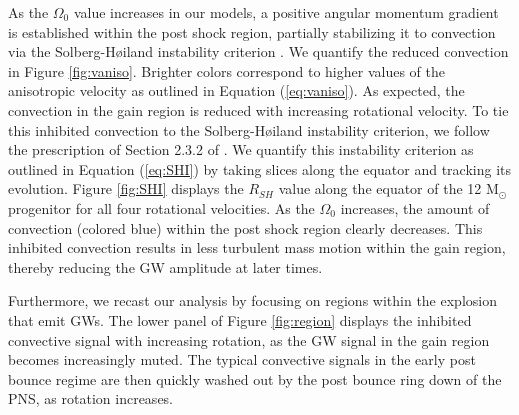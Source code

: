 \documentclass[twocolumn,times]{aastex62}  %
\newcommand{\Msun}{\ensuremath{\mathrm{M}_\odot}\xspace}
\begin{document}
  As the $\Omega_0$ value increases in our models, a positive angular momentum gradient is established within the post shock region, partially stabilizing it to convection via the Solberg-H{\o}iland instability criterion \citep{endal:1978,fryer:2000}.  We quantify the reduced convection in Figure \ref{fig:vaniso}.  Brighter colors correspond to higher values of the anisotropic velocity as outlined in Equation (\ref{eq:vaniso}).  As expected, the convection in the gain region is reduced with increasing rotational velocity.  To tie this inhibited convection to the Solberg-H{\o}iland instability criterion, we follow the prescription of Section 2.3.2 of \citet{heger:2000}.  We quantify this instability criterion as outlined in Equation (\ref{eq:SHI}) by taking slices along the equator and tracking its evolution.  Figure \ref{fig:SHI} displays the $R_{SH}$ value along the equator of the 12 \Msun progenitor for all four rotational velocities.  As the $\Omega_0$ increases, the amount of convection (colored blue) within the post shock region clearly decreases.  This inhibited convection results in less turbulent mass motion within the gain region, thereby reducing the GW amplitude at later times.  %
 
Furthermore, we recast our analysis by focusing on regions within the explosion that emit GWs.  The lower panel of Figure \ref{fig:region} displays the inhibited convective signal with increasing rotation, as the GW signal in the gain region becomes increasingly muted.  The typical convective signals in the early post bounce regime are then quickly washed out by the post bounce ring down of the PNS, as rotation increases.
\end{document}
